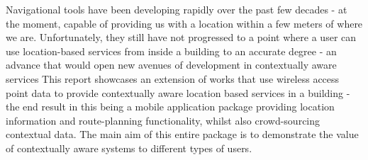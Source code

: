 Navigational tools have been developing rapidly over the past few decades - at the moment, capable of providing us with a location within a few meters of where we are. Unfortunately, they still have not progressed to a point where a user can use location-based services from inside a building to an accurate degree - an advance that would open new avenues of development in contextually aware services
\newline
\newline
This report showcases an extension of works that use wireless access point data to provide contextually aware location based services in a building - the end result in this being a mobile application package providing location information and route-planning functionality, whilst also crowd-sourcing contextual data. The main aim of this entire package is to demonstrate the value of contextually aware systems to different types of users.